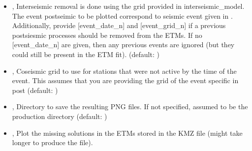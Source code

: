 \documentclass[letterpaper,10pt,english]{sphinxmanual}
\begin{document}
\begin{itemize}
\item {} 
\sphinxAtStartPar
{\hyperref[\detokenize{pgamit.com:PlotMapView.py--post}]{}} , {\hyperref[\detokenize{pgamit.com:PlotMapView.py---postseismic}]{}}  \sphinxhyphen{} Interseismic removal is done using the grid provided in \textendash{}interseismic\_model. The event postseimic to be plotted correspond to seismic event given in . Additionally, provide {[}event\_date\_n{]} and {[}event\_grid\_n{]} if a previous postsiesmic processes should be removed from the ETMs. If no {[}event\_date\_n{]} are given, then any previous events are ignored (but they could still be present in the ETM fit). (default: )

\item {} 
\sphinxAtStartPar
{\hyperref[\detokenize{pgamit.com:PlotMapView.py--co}]{}} , {\hyperref[\detokenize{pgamit.com:PlotMapView.py---coseismic}]{}}  \sphinxhyphen{} Coseismic grid to use for stations that were not active by the time of the event. This assumes that you are providing the grid of the event specific in \sphinxhyphen{}post (default: )

\item {} 
\sphinxAtStartPar
{\hyperref[\detokenize{pgamit.com:PlotMapView.py--dir}]{}} , {\hyperref[\detokenize{pgamit.com:PlotMapView.py---directory}]{}}  \sphinxhyphen{} Directory to save the resulting PNG files. If not specified, assumed to be the production directory (default: )

\item {} 
\sphinxAtStartPar
{\hyperref[\detokenize{pgamit.com:PlotMapView.py--missing}]{}}, {\hyperref[\detokenize{pgamit.com:PlotMapView.py---plot_missing_solutions}]{}} \sphinxhyphen{} Plot the missing solutions in the ETMs stored in the KMZ file (might take longer to produce the file).

\end{itemize}
\end{document}
